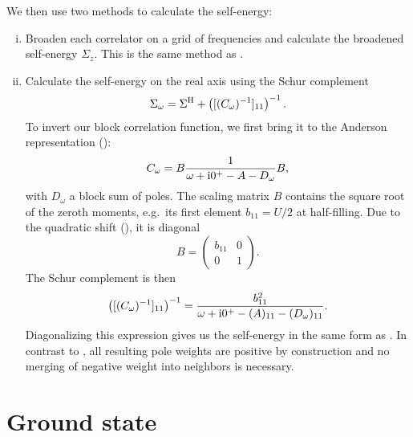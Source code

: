 We then use two methods to calculate the self-energy:
\begin{enumerate}[(i)]
    \item Broaden each correlator on a grid of frequencies
          and calculate the broadened self-energy $\Sigma_z$.
          This is the same method as \cite{Kugler2022}.

    \item Calculate the self-energy on the real axis using the Schur complement \cite{Schur1917}
          \begin{equation}
              \Sigma_\omega = \Sigma^{\mathrm{H}} + \left([(C_\omega)^{-1}]_{11}\right)^{-1}.
          \end{equation}
          To invert our block correlation function, we first bring it to
          the Anderson representation ():
          \begin{equation}
              C_\omega = B\frac{1}{\omega + \mathrm{i}0^+ - A - D_\omega}B,
          \end{equation}
          with $D_\omega$ a block sum of poles.
          The scaling matrix $B$ contains the square root of the zeroth moments,
          e.g.\ its first element $b_{11} = U/2$ at half-filling.
          Due to the quadratic shift (), it is diagonal
          \begin{equation}
              B
              =
              \begin{pmatrix}
                  b_{11} & 0 \\
                  0      & 1
              \end{pmatrix}.
          \end{equation}
          The Schur complement is then
          \begin{equation}
              \left([(C_\omega)^{-1}]_{11}\right)^{-1}
              =
              \frac{b_{11}^2}{\omega + \mathrm{i}0^+ - (A)_{11} - (D_\omega)_{11}}.
          \end{equation}
          Diagonalizing this expression gives us the self-energy in the same form as
          .
          In contrast to ,
          all resulting pole weights are positive by construction
          and no merging of negative weight into neighbors is necessary.
\end{enumerate}

\section{Ground state}

